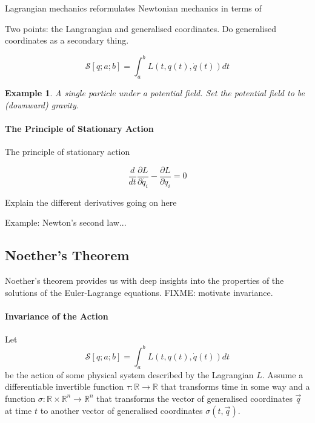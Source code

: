 \documentclass[preprint]{sigplanconf}
\theoremstyle{examplestyle}
\newtheorem{example}{Example}
\begin{document}
Lagrangian mechanics reformulates Newtonian mechanics in terms of 

Two points: the Langrangian and generalised coordinates. Do
generalised coordinates as a secondary thing.

\begin{displaymath}
  \mathcal{S}[q;a;b] = \int_a^b L(t,q(t),\dot{q}(t)) \mathit{dt}
\end{displaymath}

\begin{example}
  A single particle under a potential field. Set the potential field
  to be (downward) gravity.
\end{example}

\paragraph{The Principle of Stationary Action}

The principle of stationary action 

\begin{displaymath}
  \frac{d}{dt}\frac{\partial L}{\partial \dot{q_i}} - \frac{\partial L}{\partial q_i} = 0
\end{displaymath}

Explain the different derivatives going on here

Example: Newton's second law...

\subsection{Noether's Theorem} Noether's theorem provides us with deep
insights into the properties of the solutions of the Euler-Lagrange
equations. FIXME: motivate invariance.

\paragraph{Invariance of the Action} Let
\begin{displaymath}
  \mathcal{S}[q;a;b] = \int_a^b L(t,q(t),\dot{q}(t)) \mathit{dt}
\end{displaymath}
be the action of some physical system described by the Lagrangian
$L$. Assume a differentiable invertible function $\tau : \mathbb{R}
\to \mathbb{R}$ that transforms time in some way and a function
$\sigma : \mathbb{R} \times \mathbb{R}^n \to \mathbb{R}^n$ that
transforms the vector of generalised coordinates $\vec{q}$ at time $t$
to another vector of generalised coordinates $\sigma(t,\vec{q})$.
\end{document}

